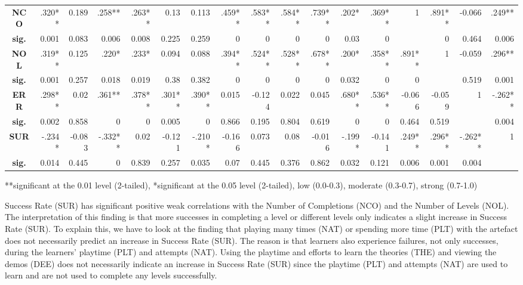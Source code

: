 \documentclass[conference]{IEEEtran}
\begin{document}
\begin{table}[]
{\begin{tabular}{|c|rrrrrr|rrrr|rrrrrr|}
      \textbf{NCO} & .320** & 0.189 & .258** & .263** & 0.13 & 0.113 & .459** & .583** & .584** & .739** & .202* & .369** & 1 & .891** & -0.066 & .249** \\
      \textbf{sig.} & 0.001 & 0.083 & 0.006 & 0.008 & 0.225 & 0.259 & 0 & 0 & 0 & 0 & 0.03 & 0 &  & 0 & 0.464 & 0.006 \\
      \textbf{NOL} & .319** & 0.125 & .220* & .233* & 0.094 & 0.088 & .394** & .524** & .528** & .678** & .200* & .358** & .891** & 1 & -0.059 & .296** \\
      \textbf{sig.} & 0.001 & 0.257 & 0.018 & 0.019 & 0.38 & 0.382 & 0 & 0 & 0 & 0 & 0.032 & 0 & 0 &  & 0.519 & 0.001 \\
      \textbf{ERR} & .298** & 0.02 & .361** & .378** & .301** & .390** & 0.015 & -0.124 & 0.022 & 0.045 & .680** & .536** & -0.066 & -0.059 & 1 & -.262** \\
      \textbf{sig.} & 0.002 & 0.858 & 0 & 0 & 0.005 & 0 & 0.866 & 0.195 & 0.804 & 0.619 & 0 & 0 & 0.464 & 0.519 &  & 0.004 \\
      \textbf{SUR} & -.234* & -0.083 & -.332** & 0.02 & -0.121 & -.210* & -0.166 & 0.073 & 0.08 & -0.016 & -.199* & -0.141 & .249** & .296** & -.262** & 1 \\
      \textbf{sig.} & 0.014 & 0.445 & 0 & 0.839 & 0.257 & 0.035 & 0.07 & 0.445 & 0.376 & 0.862 & 0.032 & 0.121 & 0.006 & 0.001 & 0.004 &  \\ \hline
    \end{tabular}%
  }
\flushright 
\scriptsize
**significant at the 0.01 level (2-tailed), *significant at the 0.05 level (2-tailed), low (0.0-0.3), moderate (0.3-0.7), strong (0.7-1.0)
\end{table}

Success Rate (SUR) has significant positive weak correlations with the Number of Completions (NCO) and the Number of Levels (NOL). The interpretation of this finding is that more successes in completing a level or different levels only  indicates a slight increase in Success Rate (SUR). To explain this, we have to look at the finding that playing many times (NAT) or spending more time (PLT) with the artefact does not necessarily predict an increase in Success Rate (SUR). The reason is that learners also experience failures, not only successes, during the learners’ playtime (PLT) and attempts (NAT). Using the playtime and efforts to learn the theories (THE) and viewing the demos (DEE) does not necessarily indicate an increase in Success Rate (SUR) since the playtime (PLT) and attempts (NAT) are used to learn and are not used to complete any levels successfully. 
\end{document}
